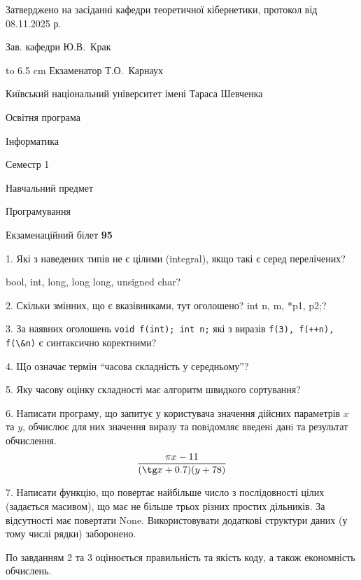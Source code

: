 \documentclass[12pt, ukrainian]{article}
\def\code#1{\Verb!#1!}
\begin{document}
{\smallskip\smallskip \begin {scriptsize} Затверджено на засіданні кафедри теоретичної кібернетики, протокол   від   08.11.2025 р.\par\smallskip\smallskip\smallskip\smallskip
{\parbox {6.5 cm} {Зав. кафедри \dotfill Ю.В.~Крак}}\hspace {0.7cm} {\hbox to 6.5 cm { Екзаменатор \dotfill Т.О.~Карнаух}} \end{scriptsize}}
\newpage
{{\begin {scriptsize}\par
{ \center  Київський національний університет імені Тараса Шевченка \par}
{\parbox {5 cm}{Освітня програма \hfill}{\parbox {7 cm}{Інформатика\hfill}}\parbox {6 cm}{\hfill Семестр 1}}\par
{\parbox {5 cm} {Навчальний предмет \hfill}\parbox {7 cm}{Програмування \hfill}\parbox {6cm}{\hfill}\par}\vspace{-15pt} \end{scriptsize}}{\center Екзаменаційний білет \No \textbf { 95 }\par}}
{%
1. Які з наведених типів не є цілими (integral), якщо такі є серед перелічених?

bool, int, long, long long, unsigned char?
\par
\vspace{2mm}
2. Скільки змінних, що є вказівниками, тут оголошено?
int n, m, *p1, p2;?
\par
\vspace{2mm}
3. За наявних оголошень \code{void f(int); int n;} які з виразів \code{f(3), f(++n), f(\&n)} є синтаксично коректними?
\par
\vspace{2mm}
4. Що означає термін ``часова складність у середньому''?
\par
\vspace{2mm}
5. Яку часову оцінку складності має алгоритм швидкого сортування?
\par
\vspace{2mm}
6. Написати програму, що запитує у користувача значення дійсних параметрів $x$ та $y$, обчислює для них значення виразу та повiдомляє введенi данi та результат обчислення.
$$\frac{\pi x - 11}{(\tg x + 0.7) (y + 78)}$$ 

\par
7. Написати функцію, що повертає найбільше число з послідовності цілих (задається масивом), що має не більше трьох різних простих дільників. За відсутності має повертати None. Використовувати додаткові структури даних (у тому числі рядки) заборонено.

По завданням 2 та 3 оцінюється правильність та якість коду, а також економність обчислень.

}
\end{document}
